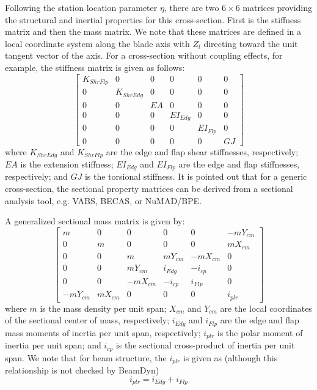 Following the station location parameter $\eta$, there are two $6 \times 6$ matrices providing the structural and inertial properties for this cross-section. 
First is the stiffness matrix and then the mass matrix. 
We note that these matrices are defined in a local coordinate system along the blade axis with $Z_{l}$ directing toward the unit tangent vector of the axis. 
For a cross-section without coupling effects, for example, the stiffness matrix is given as follows:
\begin{equation}
    \label{Stiffness}
    \begin{bmatrix}
    K_{ShrFlp} & 0 & 0 & 0 & 0 & 0 \\
    0 & K_{ShrEdg} & 0 & 0 & 0 & 0 \\
    0 & 0& EA & 0 & 0 & 0 \\
    0 & 0 & 0 & EI_{Edg} & 0 & 0 \\
    0 & 0 & 0 & 0 & EI_{Flp} & 0 \\
    0 & 0 & 0 & 0 & 0 & GJ
    \end{bmatrix}
\end{equation}
where $K_{ShrEdg}$ and $K_{ShrFlp}$ are the edge and flap shear stiffnesses, respectively; $EA$ is the extension stiffness; $EI_{Edg}$ and $EI_{Flp}$ are the edge and flap stiffnesses, respectively; and $GJ$ is the torsional stiffness. It is pointed out that for a generic cross-section, the sectional property matrices can be derived from a sectional analysis tool, e.g. VABS, BECAS, or NuMAD/BPE.

A generalized sectional mass matrix is given by:
\begin{equation}
    \label{Mass}
    \begin{bmatrix}
    m & 0 & 0 & 0 & 0 & -m Y_{cm} \\
    0 & m & 0 & 0 & 0 & m X_{cm}\\
    0 & 0& m & m Y_{cm} & -m X_{cm} & 0 \\
    0 & 0 & m Y_{cm} & i_{Edg} & -i_{cp} & 0 \\
    0 & 0 &-m X_{cm} & -i_{cp} & i_{Flp} & 0 \\
    -m Y_{cm} & m X_{cm} & 0 & 0 & 0 & i_{plr}
    \end{bmatrix}
\end{equation}
where $m$ is the mass density per unit span; $X_{cm}$ and $Y_{cm}$ are the local coordinates of the sectional center of mass, respectively; $i_{Edg}$ and $i_{Flp}$ are the edge and flap mass moments of inertia per unit span, respectively; $i_{plr}$ is the polar moment of inertia per unit span; and $i_{cp}$ is the sectional cross-product of inertia per unit span. 
We note that for beam structure, the $i_{plr}$ is given as  (although this relationship is not checked by BeamDyn)
\begin{equation}
    \label{PolarMOI} %
    i_{plr} = i_{Edg} + i_{Flp}
\end{equation}


